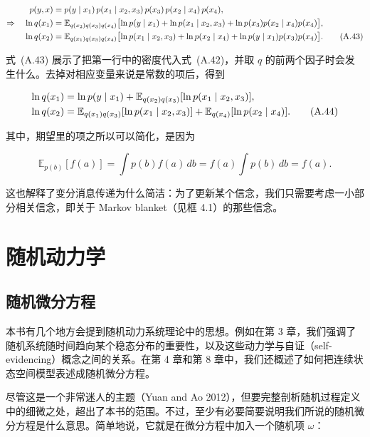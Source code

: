 \begin{align}
p(y,x)
&=
p(y\mid x_1)\,
p(x_1\mid x_2,x_3)\,
p(x_3)\,
p(x_2\mid x_4)\,
p(x_4),
\notag \\
\Rightarrow\quad
\ln q(x_1)
&=
\mathbb{E}_{q(x_2)q(x_3)q(x_4)}
\bigl[
\ln p(y\mid x_1)
+ \ln p(x_1\mid x_2,x_3)
+ \ln p(x_3)p(x_2\mid x_4)p(x_4)
\bigr],
\notag \\
\ln q(x_2)
&=
\mathbb{E}_{q(x_1)q(x_3)q(x_4)}
\bigl[
\ln p(x_1\mid x_2,x_3)
+ \ln p(x_2\mid x_4)
+ \ln p(y\mid x_1)p(x_3)p(x_4)
\bigr].
\tag{A.43}
\end{align}

式~(A.43) 展示了把第一行中的密度代入式~(A.42)，并取 $q$ 的前两个因子时会发生什么。去掉对相应变量来说是常数的项后，得到

\begin{align}
\ln q(x_1)
&=
\ln p(y\mid x_1)
+ \mathbb{E}_{q(x_2)q(x_3)}[\ln p(x_1\mid x_2,x_3)],
\notag \\
\ln q(x_2)
&=
\mathbb{E}_{q(x_1)q(x_3)}[\ln p(x_1\mid x_2,x_3)]
+ \mathbb{E}_{q(x_4)}[\ln p(x_2\mid x_4)].
\tag{A.44}
\end{align}

其中，期望里的项之所以可以简化，是因为

\begin{equation}
\mathbb{E}_{p(b)}[f(a)]
=
\int p(b)f(a)\,db
=
f(a)\int p(b)\,db
= f(a).
\tag{A.45}
\end{equation}

这也解释了变分消息传递为什么简洁：为了更新某个信念，我们只需要考虑一小部分相关信念，即关于 Markov blanket（见框 4.1）的那些信念。

\section{随机动力学}

\subsection{随机微分方程}

本书有几个地方会提到随机动力系统理论中的思想。例如在第 3 章，我们强调了随机系统随时间趋向某个稳态分布的重要性，以及这些动力学与自证（self-evidencing）概念之间的关系。在第 4 章和第 8 章中，我们还概述了如何把连续状态空间模型表述成随机微分方程。

尽管这是一个非常迷人的主题（Yuan and Ao 2012），但要完整剖析随机过程定义中的细微之处，超出了本书的范围。不过，至少有必要简要说明我们所说的随机微分方程是什么意思。简单地说，它就是在微分方程中加入一个随机项 $\omega$：

